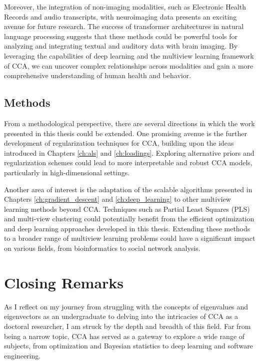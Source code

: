 Moreover, the integration of non-imaging modalities, such as Electronic Health Records and audio transcripts, with neuroimaging data presents an exciting avenue for future research. The success of transformer architectures in natural language processing suggests that these methods could be powerful tools for analyzing and integrating textual and auditory data with brain imaging. By leveraging the capabilities of deep learning and the multiview learning framework of CCA, we can uncover complex relationships across modalities and gain a more comprehensive understanding of human health and behavior.

\subsection{Methods}

From a methodological perspective, there are several directions in which the work presented in this thesis could be extended. One promising avenue is the further development of regularization techniques for CCA, building upon the ideas introduced in Chapters \ref{ch:als} and \ref{ch:loadings}. Exploring alternative priors and regularization schemes could lead to more interpretable and robust CCA models, particularly in high-dimensional settings.

Another area of interest is the adaptation of the scalable algorithms presented in Chapters \ref{ch:gradient_descent} and \ref{ch:deep_learning} to other multiview learning methods beyond CCA. Techniques such as Partial Least Squares (PLS) and multi-view clustering could potentially benefit from the efficient optimization and deep learning approaches developed in this thesis. Extending these methods to a broader range of multiview learning problems could have a significant impact on various fields, from bioinformatics to social network analysis.

\section{Closing Remarks}

As I reflect on my journey from struggling with the concepts of eigenvalues and eigenvectors as an undergraduate to delving into the intricacies of CCA as a doctoral researcher, I am struck by the depth and breadth of this field. Far from being a narrow topic, CCA has served as a gateway to explore a wide range of subjects, from optimization and Bayesian statistics to deep learning and software engineering.

